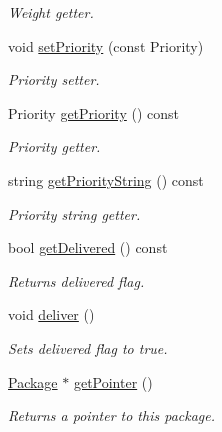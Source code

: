 \begin{DoxyCompactItemize}
\begin{DoxyCompactList}\small\item\em Weight getter. \end{DoxyCompactList}\item 
void \hyperlink{classPackage_afe16b4fbff0a050019ddf47978001464}{set\+Priority} (const Priority)
\begin{DoxyCompactList}\small\item\em Priority setter. \end{DoxyCompactList}\item 
Priority \hyperlink{classPackage_a89dc6064fa77412299f1076056e6128a}{get\+Priority} () const 
\begin{DoxyCompactList}\small\item\em Priority getter. \end{DoxyCompactList}\item 
string \hyperlink{classPackage_aaf5a625d7851e24dd18bae23309c03d7}{get\+Priority\+String} () const 
\begin{DoxyCompactList}\small\item\em Priority string getter. \end{DoxyCompactList}\item 
bool \hyperlink{classPackage_a451673bf60ccf8361f9dfbe14d4ebe52}{get\+Delivered} () const 
\begin{DoxyCompactList}\small\item\em Returns delivered flag. \end{DoxyCompactList}\item 
void \hyperlink{classPackage_ab90644a711aa033414de576d177f2c38}{deliver} ()\hypertarget{classPackage_ab90644a711aa033414de576d177f2c38}{}\label{classPackage_ab90644a711aa033414de576d177f2c38}

\begin{DoxyCompactList}\small\item\em Sets delivered flag to true. \end{DoxyCompactList}\item 
\hyperlink{classPackage}{Package} $\ast$ \hyperlink{classPackage_a77c9ac0d3d435ce001757fe9f7ffdd98}{get\+Pointer} ()\hypertarget{classPackage_a77c9ac0d3d435ce001757fe9f7ffdd98}{}\label{classPackage_a77c9ac0d3d435ce001757fe9f7ffdd98}

\begin{DoxyCompactList}\small\item\em Returns a pointer to this package. \end{DoxyCompactList}\end{DoxyCompactItemize}
